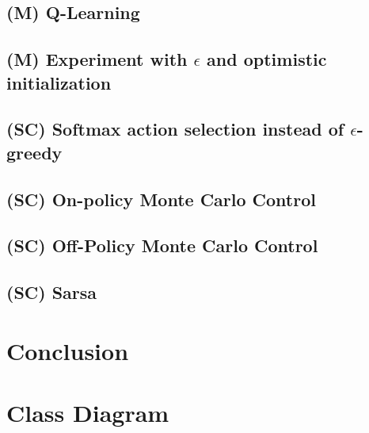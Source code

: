 \documentclass{article}
\begin{document}
\subsection{(M) Q-Learning}
\subsection{(M) Experiment with $\epsilon$ and optimistic initialization}
\subsection{(SC) Softmax action selection instead of $\epsilon$-greedy}
\subsection{(SC) On-policy Monte Carlo Control}
\subsection{(SC) Off-Policy Monte Carlo Control}
\subsection{(SC) Sarsa}

\section{Conclusion}

\newpage
\nocite{*}



\newpage
\appendix
\appendixpage
\section{Class Diagram} \label{app:classDiagram}
\end{document}
